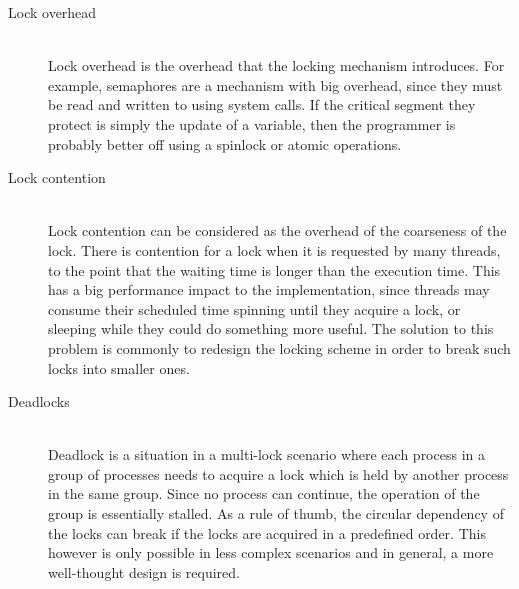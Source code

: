\begin{description}
	\item[Lock overhead] \hfill \\
		Lock overhead is the overhead that the locking mechanism 
		introduces.  For example, semaphores are a mechanism with big 
		overhead, since they must be read and written to using system 
		calls. If the critical segment they protect is simply the 
		update of a variable, then the programmer is probably better 
		off using a spinlock or atomic operations.
	\item[Lock contention] \hfill \\
		Lock contention can be considered as the overhead of the 
		coarseness of the lock. There is contention for a lock when it 
		is requested by many threads, to the point that the waiting 
		time is longer than the execution time.
		This has a big performance impact to the implementation, since 
		threads may consume their scheduled time spinning until they 
		acquire a lock, or sleeping while they could do something more 
		useful.
		The solution to this problem is commonly to redesign the 
		locking scheme in order to break such locks into smaller ones.
	\item[Deadlocks] \hfill \\
		Deadlock is a situation in a multi-lock scenario where each 
		process in a group of processes needs to acquire a lock which 
		is held by another process in the same group. Since no process 
		can continue, the operation of the group is essentially 
		stalled.
		As a rule of thumb, the circular dependency of the locks can 
		break if the locks are acquired in a predefined order. This 
		however is only possible in less complex scenarios and in 
		general, a more well-thought design is required.
\end{description}
